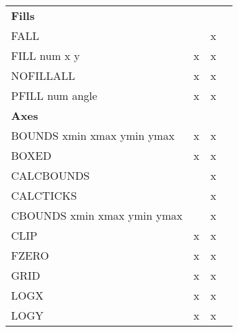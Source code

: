 \begin{center}
\begin{tabular}{lccc}
%  
{\bf Fills}                      &           &        &                    \\
FALL                             &           &     x  &                    \\
FILL  num   x   y                &     x     &     x  &                    \\
NOFILLALL                        &     x     &     x  &                    \\
PFILL  num   angle               &     x     &     x  &                    \\ \hline
{\bf Axes}                       &           &        &                    \\
BOUNDS xmin xmax ymin ymax       &     x     &     x  &                    \\
BOXED                            &     x     &     x  &                    \\
CALCBOUNDS                       &           &     x  &                    \\
CALCTICKS                        &           &     x  &                    \\
CBOUNDS xmin xmax ymin ymax      &           &     x  &                    \\
CLIP                             &     x     &     x  &                    \\
FZERO                            &     x     &     x  &                    \\
GRID                             &     x     &     x  &                    \\
LOGX                             &     x     &     x  &                    \\
LOGY                             &     x     &     x  &                    \\

\end{tabular}
\end{center}
